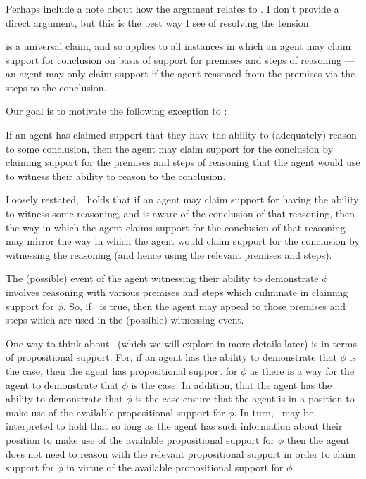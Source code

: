 \subsubsection{\EAS{}}
\label{sec:eas}

{
  \color{red}
  Perhaps include a note about how the argument relates to \EAS{}.
  I don't provide a direct argument, but this is the best way I see of resolving the tension.
}

\begin{note}[Alternative]
  \ESU{} is a universal claim, and so applies to all instances in which an agent may claim support for conclusion on basis of support for premises and steps of reasoning --- an agent may only claim support if the agent reasoned from the premises via the steps to the conclusion.

  Our goal is to motivate the following exception to \ESU{}:
  \begin{proposition}[\EAS{-} --- \EAS{}]\label{prop:EAS}
    If an agent has claimed support that they have the ability to (adequately) reason to some conclusion, then the agent may claim support for the conclusion by claiming support for the premises and steps of reasoning that the agent would use to witness their ability to reason to the conclusion.
  \end{proposition}

  Loosely restated,~\EAS{} holds that if an agent may claim support for having the ability to witness some reasoning, and is aware of the conclusion of that reasoning, then the way in which the agent claims support for the conclusion of that reasoning may mirror the way in which the agent would claim support for the conclusion by witnessing the reasoning (and hence using the relevant premises and steps).

  The (possible) event of the agent witnessing their ability to demonstrate \(\phi\) involves reasoning with various premises and steps which culminate in claiming support for \(\phi\).
  So, if~\EAS{} is true, then the agent may appeal to those premises and steps which are used in the (possible) witnessing event.

  One way to think about~\EAS{} (which we will explore in more details later) is in terms of propositional support.
  For, if an agent has the ability to demonstrate that \(\phi\) is the case, then the agent has propositional support for \(\phi\) as there is a way for the agent to demonstrate that \(\phi\) is the case.
  In addition, that the agent has the ability to demonstrate that \(\phi\) is the case ensure that the agent is in a position to make use of the available propositional support for \(\phi\).
  In turn,~\EAS{} may be interpreted to hold that so long as the agent has such information about their position to make use of the available propositional support for \(\phi\) then the agent does not need to reason with the relevant propositional support in order to claim support for \(\phi\) in virtue of the available propositional support for \(\phi\).


\end{note}
